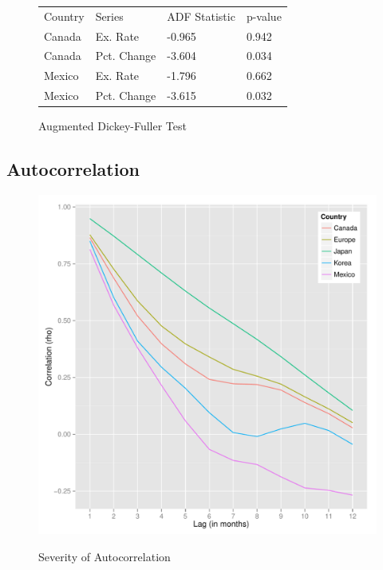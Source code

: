 \documentclass{sig-alternate-05-2015}
\begin{document}
\begin{figure}
\centering
\caption{Augmented Dickey-Fuller Test}
\begin{tabular}{l l l l}
Country & Series & ADF Statistic & p-value \\
Canada & Ex. Rate & -0.965 & 0.942 \\
Canada & Pct. Change & -3.604 & 0.034  \\
Mexico & Ex. Rate & -1.796 & 0.662 \\
Mexico & Pct. Change & -3.615 & 0.032 \\
\end{tabular}
\label{fig:adf}
\end{figure}



\subsection{Autocorrelation}

\begin{figure}
\centering
\caption{Severity of Autocorrelation}
\includegraphics[scale=0.45]{autocorrelation.pdf}
\label{fig:autocorrelation}
\end{figure}
\end{document}
